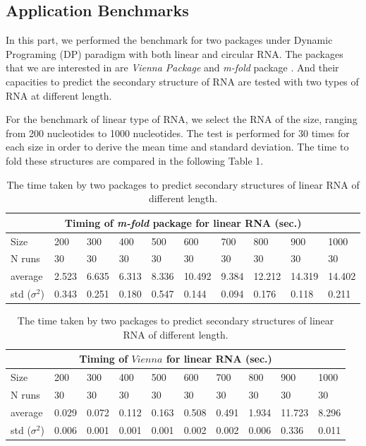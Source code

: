 \documentclass[12pt]{article}
\begin{document}
\subsection{Application Benchmarks}
In this part, we performed the benchmark for two packages under Dynamic Programing (DP) paradigm with both linear and circular RNA. The packages that we are interested in are \textit{Vienna Package} \cite{vienna} and \textit{m-fold} package \cite{zuker1989,zuker1981}. And their capacities to predict the secondary structure of RNA are tested with two types of RNA at different length.

For the benchmark of linear type of RNA, we select the RNA of the size, ranging from 200 nucleotides to 1000 nucleotides. The test is performed for 30 times for each size in order to derive the mean time and standard deviation. The time to fold these structures are compared in the following Table 1.
\begin{table}[h!]
    \begin{tabular}{ |p{1.5cm}||p{1.2cm}|p{1.2cm}|p{1.2cm}|p{1.2cm}|p{1.2cm}|p{1.2cm}|p{1.2cm}| p{1.2cm} | p{1.2cm} |}
    \hline
    \multicolumn{10}{|c|}{Timing of \textit{m-fold} package for linear RNA (sec.)} \\
    \hline
    Size& 200& 300& 400& 500& 600& 700 & 800 & 900 & 1000\\
    \hline
    N runs& 30 & 30& 30 & 30& 30& 30& 30& 30& 30\\
    \hline
    average& 2.523 & 6.635 & 6.313 & 8.336 & 10.492 & 9.384 & 12.212 & 14.319 & 14.402\\
    std ($\sigma^2$) &0.343 & 0.251 & 0.180 & 0.547 & 0.144 & 0.094 & 0.176 & 0.118 & 0.211 \\
    \hline
    \end{tabular}

    \begin{tabular}{ |p{1.5cm}||p{1.2cm}|p{1.2cm}|p{1.2cm}|p{1.2cm}|p{1.2cm}|p{1.2cm}|p{1.2cm}| p{1.2cm} | p{1.2cm} |}
    \hline
    \multicolumn{10}{|c|}{Timing of $Vienna$ for linear RNA (sec.)} \\
    \hline
    Size& 200& 300& 400& 500& 600& 700 & 800 & 900 & 1000\\
    \hline
    N runs& 30 & 30& 30 & 30& 30& 30& 30& 30& 30\\
    \hline
    average& 0.029 & 0.072 & 0.112 & 0.163 & 0.508 & 0.491 & 1.934 & 11.723 & 8.296\\
    std ($\sigma^2$) &0.006 & 0.001 & 0.001 & 0.001 & 0.002 & 0.002 & 0.006 & 0.336 & 0.011 \\
    \hline
    \end{tabular}
\caption{The time taken by two packages to predict secondary structures of linear RNA of different length.}
\end{table}
\end{document}
